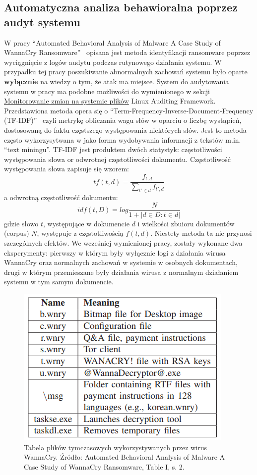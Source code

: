 \subsection{Automatyczna analiza behawioralna poprzez audyt systemu}
W pracy \foreignquote{english}{Automated Behavioral Analysis of Malware
A Case Study of WannaCry Ransomware}~\cite{8260673} opisana jest metoda identyfikacji ransomware
poprzez wyciągnięcie z logów audytu podczas rutynowego działania systemu. W przypadku tej pracy
poszukiwanie abnormalnych zachowań systemu było oparte \textbf{wyłącznie} na wiedzy o tym, że atak ma miejsce.
System do audytowania systemu w pracy ma podobne możliwości do wymienionego w sekcji \hyperref[sec:monitorowanie]
{Monitorowanie zmian na systemie plików} Linux Auditing Framework.\newline
Przedstawiona metoda opera się o \foreignquote{english}{Term-Frequency-Inverse-Document-Frequency (TF-IDF)}~\cite{salton_term-weighting_1988} czyli metrykę obliczania 
wagu słów w oparciu o liczbę wystąpień, dostosowaną do faktu częstszego występowania niektórych słów.
Jest to metoda często wykorzysytwana w jako forma wydobywania informacji z tekstów m.in. \foreignquote{english}{text miningu}.
TF-IDF jest produktem dwóch statystyk: częstotliwości występowania słowa or odwrotnej częstotliwości dokumentu.
Częstotliwość występowania słowa zapisuje się wzorem:
$$
tf(t,d) = \frac{f_{t,d}}{\sum_{t'\in d}f_{t',d}}
$$
a odwrotną częstotliwość dokumentu:
$$
idf(t,D) = log \frac{N}{1 + |{d \in D : t \in d}|}
$$
gdzie słowo $t$, występujące w dokumencie $d$ i wielkości zbuioru dokumentów (corpus) $N$, występuje z częstotliwością $f(t,d)$.
\newline
Niestety metoda ta nie przynosi szczególnych efektów. We wcześniej wymienionej pracy, zostały wykonane dwa eksperymenty: 
pierwszy w którym były wyłącznie logi z działania wirusa WannaCry oraz normalnych zachowań w systemie w osobnych dokumentach, drugi
w którym przemieszane były działania wirusa z normalnym działaniem systemu w tym samym dokumencie.
\begin{figure}[H]
    \centering
    \includegraphics[width=0.4\linewidth]{rysunki/wannashit.png}
    \caption{Tabela plików tymczasowych wykorzystywanych przez wirus WannaCry. Źródło: 
    Automated Behavioral Analysis of Malware
A Case Study of WannaCry Ransomware, Table I, s. 2.}
    \label{fig:enter-label}
\end{figure}
